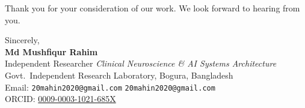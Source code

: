 \documentclass[11pt,a4paper]{article}
\begin{document}
Thank you for your consideration of our work. We look forward to hearing from you.

\vspace{12pt}
Sincerely,\\
\textbf{Md Mushfiqur Rahim}\\
Independent Researcher \quad \textit{Clinical Neuroscience \& AI Systems Architecture}\\
Govt.\ Independent Research Laboratory, Bogura, Bangladesh\\
Email: \texttt{20mahin2020@gmail.com} \quad \texttt{20mahin2020@gmail.com}\\
ORCID: \href{https://orcid.org/0009-0003-1021-685X}{0009-0003-1021-685X}
\end{document}
